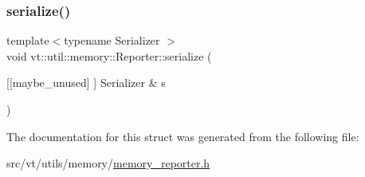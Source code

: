 \mbox{\label{structvt_1_1util_1_1memory_1_1_reporter_a7a4d509bd3dabcd5dc3bc6aabc123c37}} 
\subsubsection{\texorpdfstring{serialize()}{serialize()}}
{\footnotesize\ttfamily template$<$typename Serializer $>$ \\
void vt\+::util\+::memory\+::\+Reporter\+::serialize (\begin{DoxyParamCaption}\item[{\mbox{[}\mbox{[}maybe\+\_\+unused\mbox{]} \mbox{]} Serializer \&}]{s }\end{DoxyParamCaption})\hspace{0.3cm}{\ttfamily [inline]}}



The documentation for this struct was generated from the following file\+:\begin{DoxyCompactItemize}
\item 
src/vt/utils/memory/\hyperlink{memory__reporter_8h}{memory\+\_\+reporter.\+h}\end{DoxyCompactItemize}

